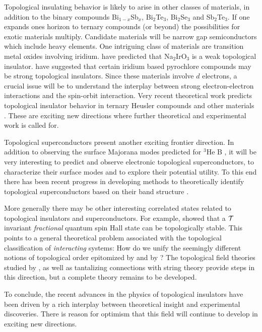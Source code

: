 \documentclass[twocolumn,floatfix,showpacs,rmp,aps]{revtex4}
\begin{document}
Topological insulating behavior is likely to arise in other classes
of materials, in addition to the binary compounds Bi$_{1-x}$Sb$_x$,
Bi$_2$Te$_3$, Bi$_2$Se$_3$ and Sb$_2$Te$_3$.
If one expands ones horizon to ternary compounds (or beyond) the
possibilities for exotic materials multiply.  Candidate materials will be narrow
gap semiconductors which include heavy elements.  One intriguing class
of materials are transition metal oxides involving iridium.
\textcite{shitade09} have predicted that
Na$_2$IrO$_3$ is a weak topological insulator.  \textcite{pesin10}
have suggested that certain iridium based pyrochlore compounds
may be strong topological insulators.  Since these materials
involve $d$ electrons, a crucial issue will be to understand the interplay
between strong electron-electron interactions and the spin-orbit interaction.
Very recent theoretical work predicts topological insulator behavior
in ternary Heusler compounds\cite{lin10a,chadov10} and other materials
\cite{lin10b,lin10c,yan10}.
These are exciting new directions where further theoretical and experimental
work is called for.

Topological superconductors present another exciting frontier direction.
In addition to observing the surface Majorana modes predicted for $^3$He B \cite{chung09}, it will be very
interesting to predict and observe electronic topological superconductors,
to characterize their surface modes
and to explore their potential utility.  To this end there
has been recent progress in developing methods to theoretically identify topological
superconductors based on their band structure \cite{qi10,fuberg10}.

More generally there may be other interesting correlated states related to topological
insulators and superconductors.  For example, \textcite{levin09} showed that
a ${\cal T}$ invariant {\it fractional} quantum spin Hall state can be topologically stable.
This points to a general theoretical problem associated with the
topological classification of {\it interacting} systems: How do we
unify the seemingly different notions of topological order
epitomized by \textcite{thouless82} and by \textcite{wen95}?
The topological field theories studied by
\textcite{qihugheszhang08}, as well as tantalizing connections
with string theory \cite{ryu10} provide steps in this direction, but a complete
theory remains to be developed.

To conclude, the recent advances in the physics of topological insulators have been driven
by a rich interplay between theoretical insight and experimental
discoveries.  There is reason for optimism that this field
will continue to develop in exciting new directions.
\end{document}
